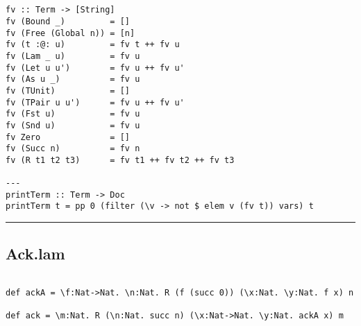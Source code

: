 \documentclass[a4paper]{report}
\begin{document}
\pagebreak
\begin{lstlisting}


fv :: Term -> [String]
fv (Bound _)         = []
fv (Free (Global n)) = [n]
fv (t :@: u)         = fv t ++ fv u
fv (Lam _ u)         = fv u
fv (Let u u')        = fv u ++ fv u'
fv (As u _)          = fv u
fv (TUnit)           = []
fv (TPair u u')      = fv u ++ fv u'
fv (Fst u)           = fv u
fv (Snd u)           = fv u
fv Zero              = []
fv (Succ n)          = fv n
fv (R t1 t2 t3)      = fv t1 ++ fv t2 ++ fv t3

---
printTerm :: Term -> Doc
printTerm t = pp 0 (filter (\v -> not $ elem v (fv t)) vars) t

\end{lstlisting}

\bigskip
\bigskip
\noindent\rule{16cm}{0.4pt}
\subsection*{Ack.lam}
\begin{lstlisting}

def ackA = \f:Nat->Nat. \n:Nat. R (f (succ 0)) (\x:Nat. \y:Nat. f x) n

def ack = \m:Nat. R (\n:Nat. succ n) (\x:Nat->Nat. \y:Nat. ackA x) m

\end{lstlisting}
\end{document}
